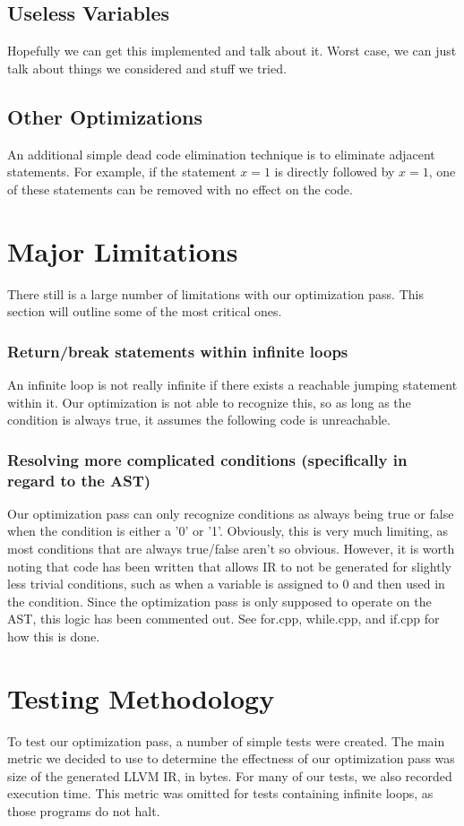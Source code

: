 \documentclass[sigconf]{acmart}
\begin{document}
\subsection{Useless Variables}
Hopefully we can get this implemented and talk about it. Worst case, we can just talk about things we considered 
and stuff we tried.

\subsection{Other Optimizations}
An additional simple dead code elimination technique is to eliminate adjacent statements.
For example, if the statement $x = 1$ is directly followed by $x = 1$, one of these statements can be removed with 
no effect on the code.

\section{Major Limitations}
There still is a large number of limitations with our optimization pass. This section will outline some of the 
most critical ones.

\subsubsection{Return/break statements within infinite loops}
An infinite loop is not really infinite if there exists a reachable jumping statement within it. 
Our optimization is not able to recognize this, so as long as the condition is always true, it assumes 
the following code is unreachable. 

\subsubsection{Resolving more complicated conditions (specifically in regard to the AST)}
Our optimization pass can only recognize conditions as always being true or false when the condition is either a 
'0' or '1'. Obviously, this is very much limiting, as most conditions that are always true/false aren't so 
obvious. However, it is worth noting that code has been written that allows IR to not be generated for slightly less 
trivial conditions, such as when a variable is assigned to 0 and then used in the condition. 
Since the optimization pass is only supposed to operate on the AST, this logic has been commented out. See for.cpp, while.cpp, and 
if.cpp for how this is done.


\section{Testing Methodology}
To test our optimization pass, a number of simple tests were created. The main metric 
we decided to use to determine the effectness of our optimization pass was size of the generated 
LLVM IR, in bytes. For many of our tests, we also recorded execution time. This metric was omitted 
for tests containing infinite loops, as those programs do not halt.
\end{document}
